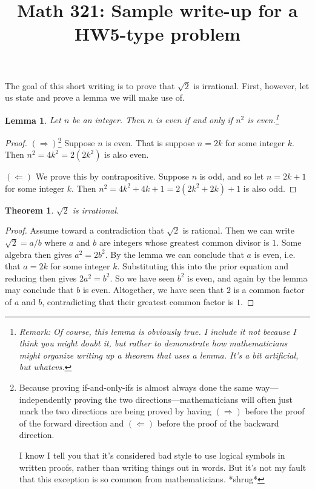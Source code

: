 \documentclass[10pt]{amsart}
\title{Math 321: Sample write-up for a HW5-type problem}
\newtheorem{theorem}{Theorem}
\newtheorem{lemma}{Lemma}
\begin{document}
\maketitle

The goal of this short writing is to prove that $\sqrt2$ is irrational. First, however, let us state and prove a lemma we will make use of.

\begin{lemma}
Let $n$ be an integer. Then $n$ is even if and only if $n^2$ is even.\footnote{Remark: Of course, this lemma is obviously true. I include it not because I think you might doubt it, but rather to demonstrate how mathematicians might organize writing up a theorem that uses a lemma. It's a bit artificial, but whatevs.}
\end{lemma}

\begin{proof}
$(\Longrightarrow)$\footnote{Because proving if-and-only-ifs is almost always done the same way---independently proving the two directions---mathematicians will often just mark the two directions are being proved by having $(\Longrightarrow)$ before the proof of the forward direction and $(\Longleftarrow)$ before the proof of the backward direction.

I know I tell you that it's considered bad style to use logical symbols in written proofs, rather than writing things out in words. But it's not my fault that this exception is so common from mathematicians. *shrug*}
Suppose $n$ is even. That is suppose $n = 2k$ for some integer $k$. Then $n^2 = 4k^2 = 2(2k^2)$ is also even.

$(\Longleftarrow)$ We prove this by contrapositive. Suppose $n$ is odd, and so let $n = 2k+1$ for some integer $k$. Then $n^2 = 4k^2 + 4k + 1 = 2(2k^2 + 2k) + 1$ is also odd.
\end{proof}

\begin{theorem}
$\sqrt 2$ is irrational.
\end{theorem}

\begin{proof}
Assume toward a contradiction that $\sqrt 2$ is rational. Then we can write $\sqrt 2 = a/b$ where $a$ and $b$ are integers whose greatest common divisor is $1$. Some algebra then gives $a^2 = 2b^2$. By the lemma we can conclude that $a$ is even, i.e. that $a = 2k$ for some integer $k$. Substituting this into the prior equation and reducing then gives $2a^2 = b^2$. So we have seen $b^2$ is even, and again by the lemma may conclude that $b$ is even. Altogether, we have seen that $2$ is a common factor of $a$ and $b$, contradicting that their greatest common factor is $1$.
\end{proof}
\end{document}
